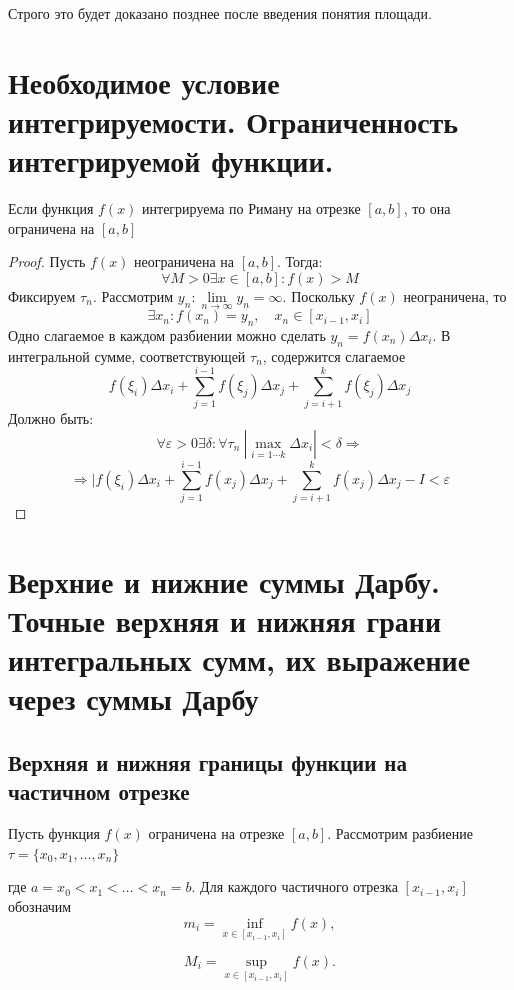 \documentclass[14pt]{extreport}
\begin{document}
Строго это будет доказано позднее после введения понятия площади.

    \chapter{Необходимое условие интегрируемости. Ограниченность интегрируемой функции.}
    \begin{theorem}
        Если функция $f(x)$ интегрируема по Риману на отрезке $[a, b]$, то она ограничена на $[a,b]$
    \end{theorem}
    \begin{proof}
        Пусть $f(x)$ неограничена на $[a,b]$. Тогда:
        $$
        \forall M > 0 \exists x \in [a,b] : f(x) > M
        $$
        Фиксируем $\tau_n$. Рассмотрим $y_n : \lim\limits_{n\to \infty }y_n = \infty$. Поскольку $f(x)$ неограничена, то $$\exists x_n : f(x_n) = y_n, \quad x_n\in[x_{i-1},x_i]$$
        Одно слагаемое в каждом разбиении можно сделать $y_n = f(x_n)\Delta x_i$.
        В интегральной сумме, соответствующей $\tau_n$, содержится слагаемое 
        $$
        f(\xi_i)\Delta x_i + \sum_{j=1}^{i-1}f(\xi_j)\Delta x_j + \sum_{j=i+1}^k f(\xi_j)\Delta x_j
        $$
        Должно быть:
        $$
        \forall \varepsilon > 0 \exists \delta : \forall \tau_n \: |\max_{i=1\cdots k} \Delta x_i| < \delta \Rightarrow
        $$
        $$
        \Rightarrow |f(\xi_i)\Delta x_i + \sum_{j=1}^{i-1}f(x_j)\Delta x_j + \sum_{j=i+1}^k f(x_j)\Delta x_j - I < \varepsilon
        $$
    \end{proof}

    \chapter{Верхние и нижние суммы Дарбу. Точные верхняя и нижняя грани интегральных сумм, их выражение через суммы Дарбу}

\section{Верхняя и нижняя границы функции на частичном отрезке}

Пусть функция $f(x)$ ограничена на отрезке $[a,b]$.
Рассмотрим разбиение $\tau=\{x_0,x_1,\ldots,x_n\}$

где $a=x_0<x_1<\ldots<x_n=b$.
Для каждого частичного отрезка $[x_{i-1},x_i]$
обозначим
\[
m_i=\inf_{x\in[x_{i-1},x_i]} f(x),
\]

\[
M_i=\sup_{x\in[x_{i-1},x_i]} f(x).
\]
\end{document}
